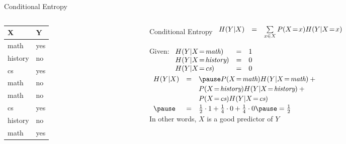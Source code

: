 \documentclass[14pt]{beamer}
\begin{document}
\begin{frame}{Conditional Entropy}
\begin{columns}
\begin{column}{0.25\textwidth}
\begin{tabular}{ll}
X               & Y   \\
\hline
math            & yes \\
history         & no  \\
cs              & yes \\
math            & no  \\
math            & no  \\
cs              & yes \\
history         & no  \\
math            & yes \\
\end{tabular}
\end{column}
\begin{column}{0.7\textwidth}
\setlength{\arraycolsep}{0.25em}
\begin{block}{Conditional Entropy}
$
\begin{array}{ l l l }
H(Y|X) & = & \sum\limits_{x \in X}P(X\!=\!x)H(Y|X\!=\!x)
\end{array}
$
\end{block}
\pause
\small
Given:
$
\begin{array}[t]{ l l l }
H(Y|X\!=\!\textit{math})    & = & 1 \\
H(Y|X\!=\!\textit{history}) & = & 0 \\
H(Y|X\!=\!\textit{cs})      & = & 0 \\
\end{array}
$ \\
\smallskip
\pause
$
\extrarowheight=2pt
\begin{array}{ l l l }
H(Y|X) & = & \pause P(X\!=\!\textit{math}) H(Y|X\!=\!\textit{math}) + \mbox{}\\
       &   & P(X\!=\!\textit{history}) H(Y|X\!=\!\textit{history}) + \mbox{}\\
       &   & P(X\!=\!\textit{cs}) H(Y|X\!=\!\textit{cs}) \\
\pause & = & \frac{1}{2} \cdot 1 + \frac{1}{4} \cdot 0 + \frac{1}{4} \cdot 0 \pause = \frac{1}{2}
\end{array}
$ \\
\medskip
\pause
In other words, $X$ is a good predictor of $Y$
\end{column}
\end{columns}
\end{frame}
\end{document}
